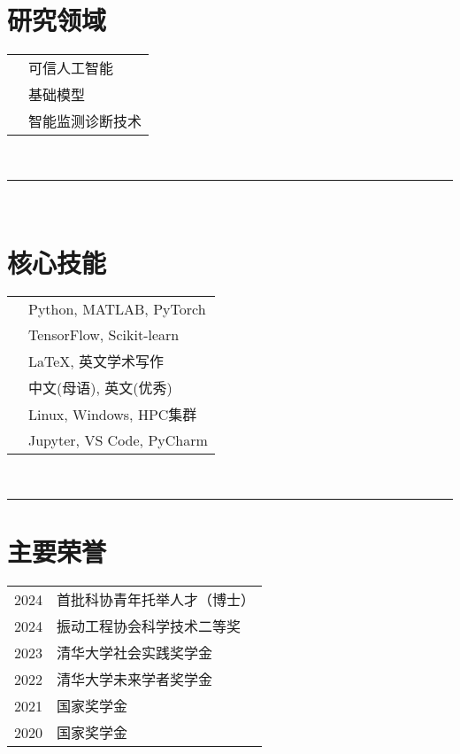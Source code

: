 \documentclass[oneside]{article}
\begin{document}
{\begin{minipage}[t][\textheight-2\fboxsep-2\fboxrule][t]{\dimexpr0.40\textwidth-2\fboxrule-2\fboxsep\relax}
        \section*{\large 研究领域}
        \begin{tabular}{cl}
            \faBrain{}      & 可信人工智能 \\
            \faCogs{}       & 基础模型 \\
            \faTools{}      & 智能监测诊断技术 \\
        \end{tabular}
        \vspace{10pt} \\
        \rule{\linewidth}{0.4pt} \\
        \section*{\large 核心技能}
        \begin{tabularx}{\textwidth}{cY}
            \faCode{}        & Python, MATLAB, PyTorch \\
            \faPen*{}        & TensorFlow, Scikit-learn \\
            \faFont{}        & LaTeX, 英文学术写作 \\
            \faLanguage{}    & 中文(母语), 英文(优秀) \\
            \faDesktop{}     & Linux, Windows, HPC集群 \\
            \faLaptopCode{}  & Jupyter, VS Code, PyCharm \\
        \end{tabularx}
        \vspace{1pt} \\
        \rule{\linewidth}{0.4pt}
        \section*{\large 主要荣誉}
        \begin{tabularx}{\textwidth}{cY}
            2024 & 首批科协青年托举人才（博士） \\
            2024 & 振动工程协会科学技术二等奖 \\
            2023 & 清华大学社会实践奖学金 \\
            2022 & 清华大学未来学者奖学金 \\
            2021 & 国家奖学金 \\
            2020 & 国家奖学金 \\
        \end{tabularx}
        \vspace{.3cm}
        \vfill
    \end{minipage}
}
\end{document}
